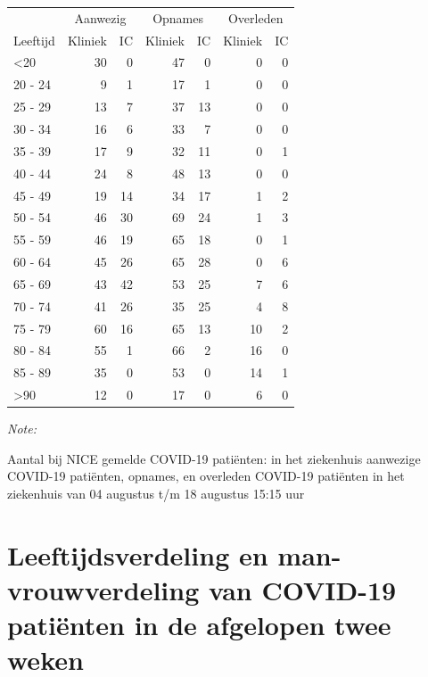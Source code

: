 \documentclass[
  english,
  man,floatsintext]{apa6}
\begin{document}
\begin{table}
\centering\begingroup\fontsize{10}{12}\selectfont

\begin{threeparttable}
\begin{tabular}{lrrrrrr}
\toprule
\multicolumn{1}{c}{ } & \multicolumn{2}{c}{Aanwezig} & \multicolumn{2}{c}{Opnames} & \multicolumn{2}{c}{Overleden} \\
\cmidrule(l{3pt}r{3pt}){2-3} \cmidrule(l{3pt}r{3pt}){4-5} \cmidrule(l{3pt}r{3pt}){6-7}
Leeftijd & Kliniek & IC & Kliniek & IC & Kliniek & IC\\
\midrule
<20 & 30 & 0 & 47 & 0 & 0 & 0\\
20 - 24 & 9 & 1 & 17 & 1 & 0 & 0\\
25 - 29 & 13 & 7 & 37 & 13 & 0 & 0\\
30 - 34 & 16 & 6 & 33 & 7 & 0 & 0\\
35 - 39 & 17 & 9 & 32 & 11 & 0 & 1\\
40 - 44 & 24 & 8 & 48 & 13 & 0 & 0\\
45 - 49 & 19 & 14 & 34 & 17 & 1 & 2\\
50 - 54 & 46 & 30 & 69 & 24 & 1 & 3\\
55 - 59 & 46 & 19 & 65 & 18 & 0 & 1\\
60 - 64 & 45 & 26 & 65 & 28 & 0 & 6\\
65 - 69 & 43 & 42 & 53 & 25 & 7 & 6\\
70 - 74 & 41 & 26 & 35 & 25 & 4 & 8\\
75 - 79 & 60 & 16 & 65 & 13 & 10 & 2\\
80 - 84 & 55 & 1 & 66 & 2 & 16 & 0\\
85 - 89 & 35 & 0 & 53 & 0 & 14 & 1\\
>90 & 12 & 0 & 17 & 0 & 6 & 0\\
\bottomrule
\end{tabular}
\begin{tablenotes}
\item \textit{Note: } 
\item Aantal bij NICE gemelde COVID-19 patiënten: in het ziekenhuis aanwezige COVID-19 patiënten, opnames, en overleden COVID-19 patiënten in het ziekenhuis van 04 augustus t/m 18 augustus 15:15 uur
\end{tablenotes}
\end{threeparttable}
\endgroup{}
\end{table}

\newpage

\hypertarget{leeftijdsverdeling-en-man-vrouwverdeling-van-covid-19-patiuxebnten-in-de-afgelopen-twee-weken}{%
\section{Leeftijdsverdeling en man-vrouwverdeling van COVID-19 patiënten in de afgelopen twee weken}\label{leeftijdsverdeling-en-man-vrouwverdeling-van-covid-19-patiuxebnten-in-de-afgelopen-twee-weken}}
\end{document}
